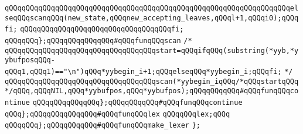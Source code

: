 \verb|qQQqqQQqqQQqqQQqqQQqqQQqqQQqqQQqqQQqqQQqqQQqqQQqqQQqqQQqqQQqqQQqqQQqelseqQQqscanqQQq(new_state,qQQqnew_accepting_leaves,qQQql+1,qQQqi0);qQQqfi;|\newline
\verb|qQQqqQQqqQQqqQQqqQQqqQQqqQQqqQQqqQQqfi;|\newline
\verb|qQQqqQQq};qQQqqQQqqQQqqQQq#qQQqfunqQQqscan|\newline
\verb|/*|\newline
\verb|qQQqqQQqqQQqqQQqqQQqqQQqqQQqqQQqqQQqstart=qQQqifqQQq(substring(*yyb,*yybufposqQQq-qQQq1,qQQq1)=="\n")qQQq*yybegin_i+1;qQQqelseqQQq*yybegin_i;qQQqfi;|\newline
\verb|*/|\newline
\verb|qQQqqQQqqQQqqQQqqQQqqQQqqQQqqQQqqQQqscan(*yybegin_iqQQq/*qQQqstartqQQq*/qQQq,qQQqNIL,qQQq*yybufpos,qQQq*yybufpos);qQQqqQQqqQQq#qQQqfunqQQqcontinue|\newline
\verb|qQQqqQQqqQQqqQQq};qQQqqQQqqQQq#qQQqfunqQQqcontinue|\newline
\verb|qQQq};qQQqqQQqqQQqqQQq#qQQqfunqQQqlex|\newline
\verb|qQQqqQQqlex;qQQq|\newline
\verb|qQQqqQQq};qQQqqQQqqQQq#qQQqfunqQQqmake_lexer|\newline
\verb|};|\newline

